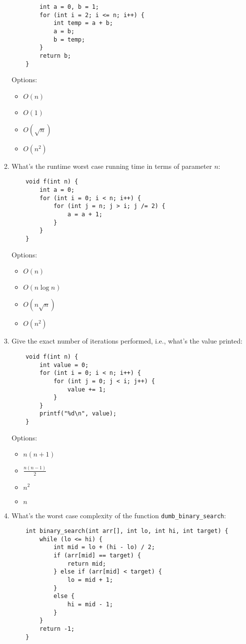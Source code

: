 \documentclass{article}
\begin{document}
\begin{enumerate}
\begin{lstlisting}
        int a = 0, b = 1;
        for (int i = 2; i <= n; i++) {
            int temp = a + b;
            a = b;
            b = temp;
        }
        return b;
    }
    \end{lstlisting}
    Options:
    \begin{itemize}
        \item \( O(n) \)
        \item \( O(1) \)
        \item \( O(\sqrt{n}) \)
        \item \( O(n^2) \)
    \end{itemize}

    \item What's the runtime worst case running time in terms of parameter \( n \):
    \begin{lstlisting}
    void f(int n) {
        int a = 0;
        for (int i = 0; i < n; i++) {
            for (int j = n; j > i; j /= 2) {
                a = a + 1;
            }
        }
    }
    \end{lstlisting}
    Options:
    \begin{itemize}
        \item \( O(n) \)
        \item \( O(n \log n) \)
        \item \( O(n \sqrt{n}) \)
        \item \( O(n^2) \)
    \end{itemize}

    \item Give the exact number of iterations performed, i.e., what’s the value printed:
    \begin{lstlisting}
    void f(int n) {
        int value = 0;
        for (int i = 0; i < n; i++) {
            for (int j = 0; j < i; j++) {
                value += 1;
            }
        }
        printf("%d\n", value);
    }
    \end{lstlisting}
    Options:
    \begin{itemize}
        \item \( n(n+1) \)
        \item \( \frac{n(n-1)}{2} \)
        \item \( n^2 \)
        \item \( n \)
    \end{itemize}
    \newpage

    \item What’s the worst case complexity of the function \texttt{dumb\_binary\_search}:
    \begin{lstlisting}
    int binary_search(int arr[], int lo, int hi, int target) {
        while (lo <= hi) {
            int mid = lo + (hi - lo) / 2;
            if (arr[mid] == target) {
                return mid;
            } else if (arr[mid] < target) {
                lo = mid + 1;
            }
            else {
                hi = mid - 1;
            }
        }
        return -1;
    }
    

\end{lstlisting}
\end{enumerate}
\end{document}

